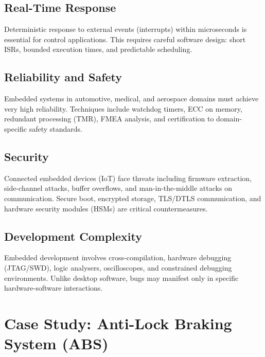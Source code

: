 \subsection{Real-Time Response}
Deterministic response to external events (interrupts) within microseconds is essential for control applications. This requires careful software design: short ISRs, bounded execution times, and predictable scheduling.

\subsection{Reliability and Safety}
Embedded systems in automotive, medical, and aerospace domains must achieve very high reliability. Techniques include watchdog timers, ECC on memory, redundant processing (TMR), FMEA analysis, and certification to domain-specific safety standards.

\subsection{Security}
Connected embedded devices (IoT) face threats including firmware extraction, side-channel attacks, buffer overflows, and man-in-the-middle attacks on communication. Secure boot, encrypted storage, TLS/DTLS communication, and hardware security modules (HSMs) are critical countermeasures.

\subsection{Development Complexity}
Embedded development involves cross-compilation, hardware debugging (JTAG/SWD), logic analysers, oscilloscopes, and constrained debugging environments. Unlike desktop software, bugs may manifest only in specific hardware-software interactions.

\section{Case Study: Anti-Lock Braking System (ABS)}
\label{sec:intro:abs}

